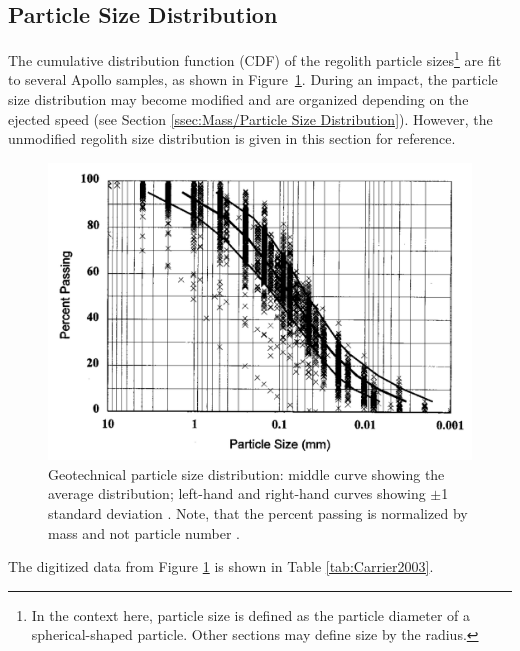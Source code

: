 \documentclass{article}
\begin{document}
\subsection{Particle Size Distribution}

The cumulative distribution function (CDF) of the regolith particle sizes\footnote{In the context here, particle size is defined as the particle diameter of a spherical-shaped particle. Other sections may define size by the radius.} are fit to several Apollo samples, as shown in Figure~\ref{fig:Carrier2003_Fig1_particle-size-distribution}. During an impact, the particle size distribution may become modified and are organized depending on the ejected speed (see Section \ref{ssec:Mass/Particle Size Distribution}). However, the unmodified regolith size distribution is given in this section for reference.
\begin{figure}[h!]
	\centering
	\includegraphics[scale=0.4]{Carrier2003_Fig1_particle-size-distribution.PNG}
	\caption{Geotechnical particle size distribution: middle curve showing the average distribution; left-hand and right-hand curves showing $\pm$1 standard deviation \citep{carrier2003particle}. Note, that the percent passing is normalized by mass and not particle number \citep[see][]{carrier1973lunar}.}\label{fig:Carrier2003_Fig1_particle-size-distribution}
\end{figure}
The digitized data from Figure \ref{fig:Carrier2003_Fig1_particle-size-distribution} is shown in Table \ref{tab:Carrier2003}.
\begin{table}
	\centering
	\caption{Digitized data points from Figure \ref{fig:Carrier2003_Fig1_particle-size-distribution}, see \cite{carrier2003particle}.}\label{tab:Carrier2003}
\end{table}
\end{document}
